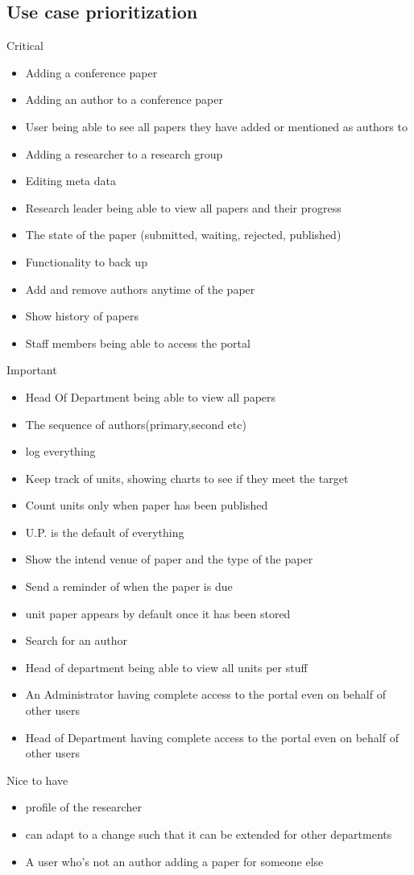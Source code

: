 \documentclass[a4paper,12pt]{article}
\begin{document}
\subsection{Use case prioritization}
Critical
\begin{itemize}
\item Adding a conference paper
\item Adding an author to a conference paper
\item User being able to see all papers they have added or mentioned as authors to
\item Adding a researcher to a research group
\item Editing meta data 
\item Research leader being able to view all papers and their progress
\item The state of the paper (submitted, waiting, rejected, published)
\item Functionality to back up 
\item Add and remove authors anytime of the paper
\item Show history of papers
\item Staff members being able to access the portal

\end{itemize}
Important
\begin{itemize}
\item Head Of Department being able to view all papers
\item The sequence of authors(primary,second etc)
\item log everything 
\item Keep track of units, showing charts to see if they meet the target
\item Count units only when paper has been published
\item U.P. is the default of everything
\item Show the intend venue of paper and the type of the paper
\item Send a reminder of when the paper is due
\item unit paper appears by default once it has been stored
\item Search for an author
\item Head of department being able to view all units per stuff
\item An Administrator having complete access to the portal even on behalf of other users
\item Head of Department having complete access to the portal even on behalf of other users
\end{itemize}
Nice to have
\begin{itemize}
 \item profile of the researcher
 \item can adapt to a change such that it can be extended for other departments
 \item A user who's not an author adding a paper for someone else
\end{itemize}
\end{document}
